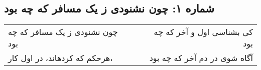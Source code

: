 \begin{center}
\section*{شماره ۱: چون نشنودی ز یک مسافر که چه بود}
\label{sec:001}
\begin{longtable}{l p{0.5cm} r}
چون نشنودی ز یک مسافر که چه بود
&&
کی بشناسی اول و آخر که چه بود
\\
هرحکم که کردهاند، در اول کار،
&&
آگاه شوی در دم آخر که چه بود
\\
\end{longtable}
\end{center}
